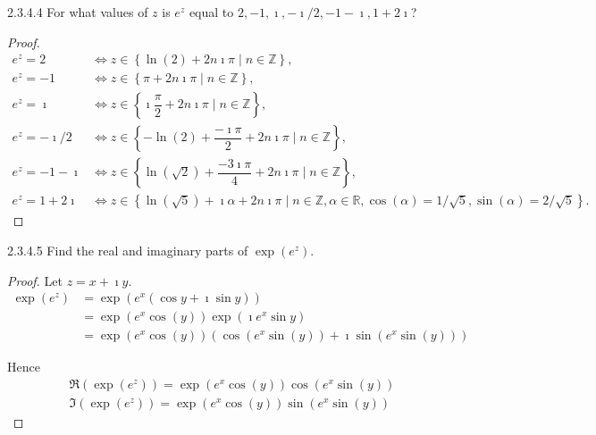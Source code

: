 \begin{problem}{2.3.4.4}
For what values of \( z \) is \( e^{z} \) equal to \( 2, -1, \imath, -\imath/2, -1 - \imath, 1 + 2\imath \)?
\end{problem}

\begin{proof}
	\begingroup
	\allowdisplaybreaks%
	\begin{align*}
		e^{z} = 2           & \iff z \in \left\{ \ln(2) +  2n\imath \pi \mid n \in \mathbb{Z} \right\},                                                                                                   \\
		e^{z} = -1          & \iff z \in \left\{ \pi + 2n\imath \pi \mid n \in \mathbb{Z} \right\},                                                                                                       \\
		e^{z} = \imath      & \iff z \in \left\{ \imath\dfrac{\pi}{2} + 2n\imath \pi \mid n \in \mathbb{Z} \right\},                                                                                      \\
		e^{z} = -\imath/2   & \iff z \in \left\{ -\ln(2) + \dfrac{-\imath \pi}{2} + 2n\imath \pi \mid n \in \mathbb{Z} \right\},                                                                          \\
		e^{z} = -1 - \imath & \iff z \in \left\{ \ln(\sqrt{2}) + \dfrac{-3\imath\pi}{4} + 2n\imath\pi \mid n \in \mathbb{Z} \right\},                                                                     \\
		e^{z} = 1 + 2\imath & \iff z \in \left\{ \ln(\sqrt{5}) + \imath\alpha + 2n\imath \pi \mid n \in \mathbb{Z}, \alpha \in \mathbb{R}, \cos(\alpha) = 1/\sqrt{5}, \sin(\alpha) = 2/\sqrt{5} \right\}.
	\end{align*}
	\endgroup
\end{proof}

\begin{problem}{2.3.4.5}
Find the real and imaginary parts of \( \exp(e^{z}) \).
\end{problem}

\begin{proof}
	Let \( z = x + \imath y \).
	\begingroup
	\allowdisplaybreaks%
	\begin{align*}
		\exp(e^{z}) & = \exp(e^{x}(\cos y + \imath \sin y))                                 \\
		            & = \exp(e^{x}\cos(y))\exp(\imath e^{x} \sin y)                         \\
		            & = \exp(e^{x}\cos(y)) (\cos(e^{x}\sin(y)) + \imath \sin(e^{x}\sin(y)))
	\end{align*}
	\endgroup

	Hence
	\[
		\begin{split}
			\Re(\exp(e^{z})) = \exp(e^{x}\cos(y)) \cos(e^{x}\sin(y)) \\
			\Im(\exp(e^{z})) = \exp(e^{x}\cos(y)) \sin(e^{x}\sin(y))
		\end{split}
	\]
\end{proof}

